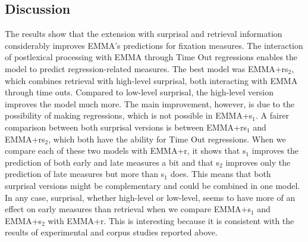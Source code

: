 \documentclass{cambridge7A}\usepackage[]{graphicx}\usepackage[]{color}
\begin{document}
\subsection{Discussion}
The results show that the extension with surprisal and retrieval information considerably improves EMMA's predictions for fixation measures. The interaction of postlexical processing with EMMA through Time Out regressions enables the model to predict regression-related measures. The best model was EMMA+rs$_2$, which combines retrieval with high-level surprisal, both interacting with EMMA through time outs.  Compared to low-level surprisal, the high-level version improves the model much more. The main improvement, however, is due to the possibility of making regressions, which is not possible in EMMA+s$_1$.  A fairer comparison between both surprisal versions is between EMMA+rs$_1$ and EMMA+rs$_2$, which both have the ability for Time Out regressions.  When we compare each of these two models with EMMA+r, it shows that s$_1$ improves the prediction of both early and late measures a bit and that s$_2$ improves only the prediction of late measures but more than s$_1$ does.  This means that both surprisal versions might be complementary and could be combined in one model. 
In any case, surprisal, whether high-level or low-level, seems to have more of an effect on early measures than retrieval when we compare EMMA+s$_1$ and EMMA+s$_2$ with EMMA+r.  This is interesting because it is consistent with the results of experimental and corpus studies reported above. 




\end{document}

